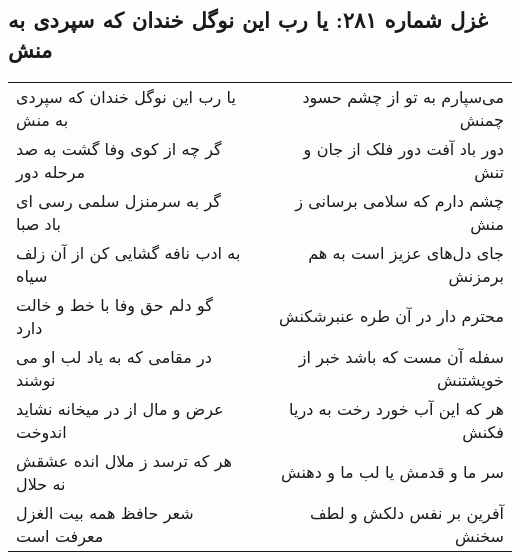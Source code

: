\begin{center}
\section*{غزل شماره ۲۸۱: یا رب این نوگل خندان که سپردی به منش}
\label{sec:sh281}
\begin{longtable}{l p{0.5cm} r}
یا رب این نوگل خندان که سپردی به منش
&&
می‌سپارم به تو از چشم حسود چمنش
\\
گر چه از کوی وفا گشت به صد مرحله دور
&&
دور باد آفت دور فلک از جان و تنش
\\
گر به سرمنزل سلمی رسی ای باد صبا
&&
چشم دارم که سلامی برسانی ز منش
\\
به ادب نافه گشایی کن از آن زلف سیاه
&&
جای دل‌های عزیز است به هم برمزنش
\\
گو دلم حق وفا با خط و خالت دارد
&&
محترم دار در آن طره عنبرشکنش
\\
در مقامی که به یاد لب او می نوشند
&&
سفله آن مست که باشد خبر از خویشتنش
\\
عرض و مال از در میخانه نشاید اندوخت
&&
هر که این آب خورد رخت به دریا فکنش
\\
هر که ترسد ز ملال انده عشقش نه حلال
&&
سر ما و قدمش یا لب ما و دهنش
\\
شعر حافظ همه بیت الغزل معرفت است
&&
آفرین بر نفس دلکش و لطف سخنش
\\
\end{longtable}
\end{center}

